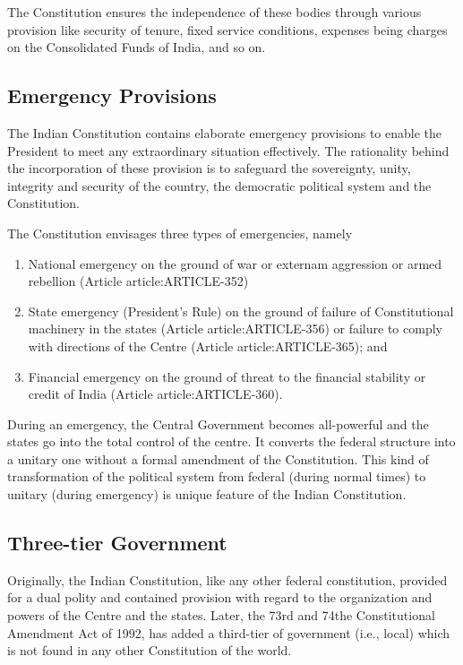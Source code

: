 \begin{multicol}{2}
The Constitution ensures the independence of these bodies through various provision like security of tenure, fixed service conditions, expenses being charges on the Consolidated Funds of India, and so on.

\subsection{Emergency Provisions}

The Indian Constitution contains elaborate emergency provisions to enable the President to meet any extraordinary situation effectively. The rationality behind the incorporation of these provision is to safeguard the sovereignty, unity, integrity and security of the country, the democratic political system and the Constitution.

The Constitution envisages three types of emergencies, namely

\renewcommand{\labelenumi}{\textbf{(\alph{enumi})}}
\begin{enumerate}
  \item National emergency on the ground of war or externam aggression or armed rebellion (Article \gls{article:ARTICLE-352})
  \item State emergency (President's Rule) on the ground of failure of Constitutional machinery in the states (Article \gls{article:ARTICLE-356}) or failure to comply with directions of the Centre (Article \gls{article:ARTICLE-365}); and
  \item Financial emergency on the ground of threat to the financial stability or credit of India (Article \gls{article:ARTICLE-360}).
\end{enumerate}

During an emergency, the Central Government becomes all-powerful and the states go into the total control of the centre. It converts the federal structure into a unitary one without a formal amendment of the Constitution. This kind of transformation of the political system from federal (during normal times) to unitary (during emergency) is unique feature of the Indian Constitution.

\subsection{Three-tier Government}

Originally, the Indian Constitution, like any other federal constitution, provided for a dual polity and contained provision with regard to the organization and powers of the Centre and the states. Later, the 73rd and 74the Constitutional Amendment Act of 1992, has added a third-tier of government (i.e., local) which is not found in any other Constitution of the world.


\end{multicol}
